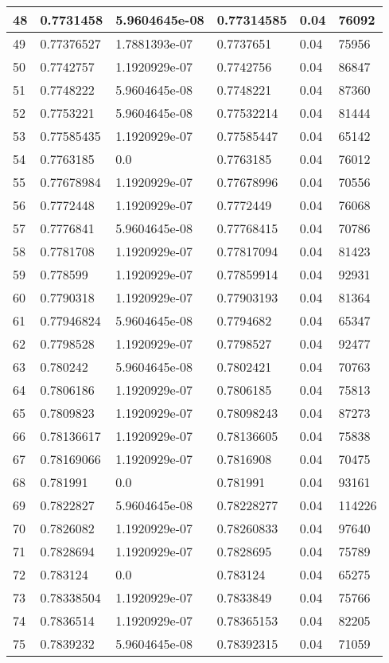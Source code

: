 \begin{longtable}{|l|l|l|l|l|l|}
48 & 0.7731458 & 5.9604645e-08 & 0.77314585 & 0.04 & 76092 \\ \hline 
49 & 0.77376527 & 1.7881393e-07 & 0.7737651 & 0.04 & 75956 \\ \hline 
50 & 0.7742757 & 1.1920929e-07 & 0.7742756 & 0.04 & 86847 \\ \hline 
51 & 0.7748222 & 5.9604645e-08 & 0.7748221 & 0.04 & 87360 \\ \hline 
52 & 0.7753221 & 5.9604645e-08 & 0.77532214 & 0.04 & 81444 \\ \hline 
53 & 0.77585435 & 1.1920929e-07 & 0.77585447 & 0.04 & 65142 \\ \hline 
54 & 0.7763185 & 0.0 & 0.7763185 & 0.04 & 76012 \\ \hline 
55 & 0.77678984 & 1.1920929e-07 & 0.77678996 & 0.04 & 70556 \\ \hline 
56 & 0.7772448 & 1.1920929e-07 & 0.7772449 & 0.04 & 76068 \\ \hline 
57 & 0.7776841 & 5.9604645e-08 & 0.77768415 & 0.04 & 70786 \\ \hline 
58 & 0.7781708 & 1.1920929e-07 & 0.77817094 & 0.04 & 81423 \\ \hline 
59 & 0.778599 & 1.1920929e-07 & 0.77859914 & 0.04 & 92931 \\ \hline 
60 & 0.7790318 & 1.1920929e-07 & 0.77903193 & 0.04 & 81364 \\ \hline 
61 & 0.77946824 & 5.9604645e-08 & 0.7794682 & 0.04 & 65347 \\ \hline 
62 & 0.7798528 & 1.1920929e-07 & 0.7798527 & 0.04 & 92477 \\ \hline 
63 & 0.780242 & 5.9604645e-08 & 0.7802421 & 0.04 & 70763 \\ \hline 
64 & 0.7806186 & 1.1920929e-07 & 0.7806185 & 0.04 & 75813 \\ \hline 
65 & 0.7809823 & 1.1920929e-07 & 0.78098243 & 0.04 & 87273 \\ \hline 
66 & 0.78136617 & 1.1920929e-07 & 0.78136605 & 0.04 & 75838 \\ \hline 
67 & 0.78169066 & 1.1920929e-07 & 0.7816908 & 0.04 & 70475 \\ \hline 
68 & 0.781991 & 0.0 & 0.781991 & 0.04 & 93161 \\ \hline 
69 & 0.7822827 & 5.9604645e-08 & 0.78228277 & 0.04 & 114226 \\ \hline 
70 & 0.7826082 & 1.1920929e-07 & 0.78260833 & 0.04 & 97640 \\ \hline 
71 & 0.7828694 & 1.1920929e-07 & 0.7828695 & 0.04 & 75789 \\ \hline 
72 & 0.783124 & 0.0 & 0.783124 & 0.04 & 65275 \\ \hline 
73 & 0.78338504 & 1.1920929e-07 & 0.7833849 & 0.04 & 75766 \\ \hline 
74 & 0.7836514 & 1.1920929e-07 & 0.78365153 & 0.04 & 82205 \\ \hline 
75 & 0.7839232 & 5.9604645e-08 & 0.78392315 & 0.04 & 71059 \\ \hline 
\end{longtable}